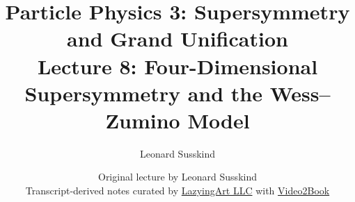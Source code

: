 \documentclass[11pt,oneside]{book}
\begin{document}
\frontmatter
\title{Particle Physics 3: Supersymmetry and Grand Unification\\[0.5em]
\large Lecture 8: Four-Dimensional Supersymmetry and the Wess--Zumino Model}
\author{Leonard Susskind}
\date{Original lecture by Leonard Susskind\\[0.4em]
Transcript-derived notes curated by
\href{https://lazying.art}{LazyingArt LLC} with
\href{https://github.com/lachlanchen/Video2Book}{Video2Book}}
\maketitle
\mainmatter

\end{document}
